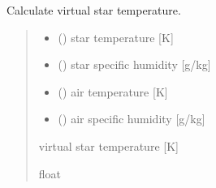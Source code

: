 \documentclass[letterpaper,10pt,english]{sphinxmanual}
\begin{document}

\begin{fulllineitems}
\label{\detokenize{users_guide:AirSeaFluxCode.flux_subs.get_tsrv}}
\pysigstartsignatures
{}
\pysigstopsignatures
\sphinxAtStartPar
Calculate virtual star temperature.
\begin{quote}\begin{description}
\begin{itemize}
\item {} 
\sphinxAtStartPar
{} () \textendash{} star temperature {[}K{]}

\item {} 
\sphinxAtStartPar
{} () \textendash{} star specific humidity {[}g/kg{]}

\item {} 
\sphinxAtStartPar
{} () \textendash{} air temperature {[}K{]}

\item {} 
\sphinxAtStartPar
{} () \textendash{} air specific humidity {[}g/kg{]}

\end{itemize}

\sphinxAtStartPar
{} \textendash{} virtual star temperature {[}K{]}

\sphinxAtStartPar
float

\end{description}\end{quote}

\end{fulllineitems}
\end{document}
